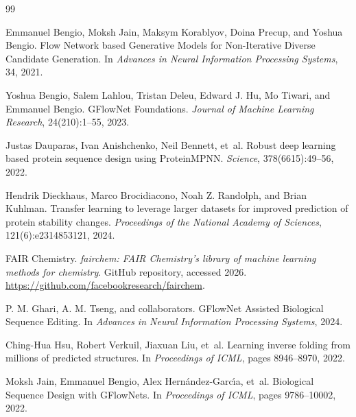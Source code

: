 \documentclass[11pt]{article}
\begin{document}
\begin{thebibliography}{99}

Emmanuel Bengio, Moksh Jain, Maksym Korablyov, Doina Precup, and Yoshua Bengio.
\newblock Flow Network based Generative Models for Non-Iterative Diverse Candidate Generation.
\newblock In \emph{Advances in Neural Information Processing Systems}, 34, 2021.

Yoshua Bengio, Salem Lahlou, Tristan Deleu, Edward J. Hu, Mo Tiwari, and Emmanuel Bengio.
\newblock GFlowNet Foundations.
\newblock \emph{Journal of Machine Learning Research}, 24(210):1--55, 2023.

Justas Dauparas, Ivan Anishchenko, Neil Bennett, et~al.
\newblock Robust deep learning based protein sequence design using ProteinMPNN.
\newblock \emph{Science}, 378(6615):49--56, 2022.

Hendrik Dieckhaus, Marco Brocidiacono, Noah Z. Randolph, and Brian Kuhlman.
\newblock Transfer learning to leverage larger datasets for improved prediction of protein stability changes.
\newblock \emph{Proceedings of the National Academy of Sciences}, 121(6):e2314853121, 2024.

FAIR Chemistry.
\newblock \emph{fairchem: FAIR Chemistry's library of machine learning methods for chemistry}.
\newblock GitHub repository, accessed 2026. \url{https://github.com/facebookresearch/fairchem}.

P. M. Ghari, A. M. Tseng, and collaborators.
\newblock GFlowNet Assisted Biological Sequence Editing.
\newblock In \emph{Advances in Neural Information Processing Systems}, 2024.

Ching-Hua Hsu, Robert Verkuil, Jiaxuan Liu, et~al.
\newblock Learning inverse folding from millions of predicted structures.
\newblock In \emph{Proceedings of ICML}, pages 8946--8970, 2022.

Moksh Jain, Emmanuel Bengio, Alex Hern{\'a}ndez-Garc{\'\i}a, et~al.
\newblock Biological Sequence Design with GFlowNets.
\newblock In \emph{Proceedings of ICML}, pages 9786--10002, 2022.


\end{thebibliography}
\end{document}
